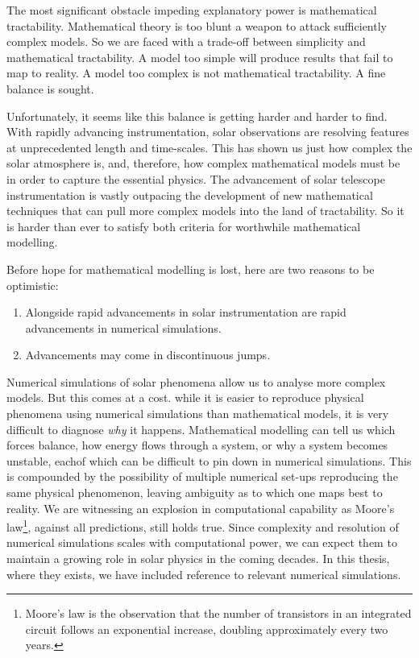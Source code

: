 \documentclass[12pt]{../style-files/ociamthesis}
\begin{document}
The most significant obstacle impeding explanatory power is mathematical tractability. Mathematical theory is too blunt a weapon to attack sufficiently complex models. So we are faced with a trade-off between simplicity and mathematical tractability. A model too simple will produce results that fail to map to reality. A model too complex is not mathematical tractability. A fine balance is sought.

Unfortunately, it seems like this balance is getting harder and harder to find. With rapidly advancing instrumentation, solar observations are resolving features at unprecedented length and time-scales. This has shown us just how complex the solar atmosphere is, and, therefore, how complex mathematical models must be in order to capture the essential physics. The advancement of solar telescope instrumentation is vastly outpacing the development of new mathematical techniques that can pull more complex models into the land of tractability. So it is harder than ever to satisfy both criteria for worthwhile mathematical modelling.

Before hope for mathematical modelling is lost, here are two reasons to be optimistic:
\begin{enumerate}
	\item Alongside rapid advancements in solar instrumentation are rapid advancements in numerical simulations.
	\item Advancements may come in discontinuous jumps.
\end{enumerate}
Numerical simulations of solar phenomena allow us to analyse more complex models. But this comes at a cost. while it is easier to reproduce physical phenomena using numerical simulations than mathematical models, it is very difficult to diagnose \textit{why} it happens. Mathematical modelling can tell us which forces balance, how energy flows through a system, or why a system becomes unstable, eachof which can be difficult to pin down in numerical simulations. This is compounded by the possibility of multiple numerical set-ups reproducing the same physical phenomenon, leaving ambiguity as to which one maps best to reality. We are witnessing an explosion in computational capability as Moore's law\footnote{Moore's law is the observation that the number of transistors in an integrated circuit follows an exponential increase, doubling approximately every two years.}, against all predictions, still holds true. Since complexity and resolution of numerical simulations scales with computational power, we can expect them to maintain a growing role in solar physics in the coming decades. In this thesis, where they exists, we have included reference to relevant numerical simulations.
\end{document}
